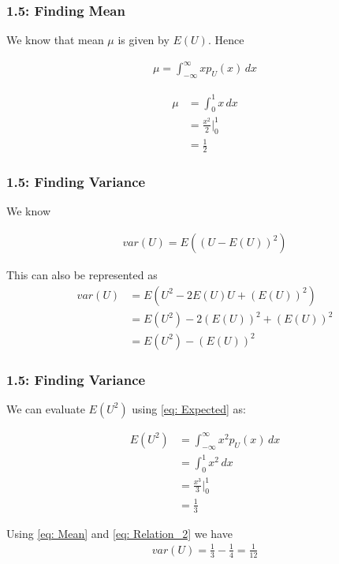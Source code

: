 \documentclass{beamer}
\begin{document}
\begin{frame}
	\frametitle{1.5: Finding Mean}
	We know that mean $\mu$ is given by $E(U)$. Hence

	\begin{align}
		\mu = \int_{-\infty}^{\infty} x p_U(x) \,dx
		\label{eq:Relation_1}
	\end{align}

	\begin{align}
		\mu &= \int_{0}^{1} x \,dx \\
		&= \frac{x^2}{2} \Bigg|^{1}_{0} \\
		&= \frac{1}{2} 
		\label{eq: Mean}
	\end{align}

\end{frame}

\begin{frame}
	\frametitle{1.5: Finding Variance}
	We know

	\begin{align}
		var(U) = E((U - E(U))^2)
	\end{align}

	This can also be represented as
	\begin{align}
		var(U) &= E(U^2 - 2E(U)U + (E(U))^2) \\
		&= E(U^2) - 2(E(U))^2 + (E(U))^2 \\
		&= E(U^2) - (E(U))^2
		\label{eq: Relation_2}
	\end{align}
	
\end{frame}

\begin{frame}
	\frametitle{1.5: Finding Variance}
	We can evaluate $E(U^2)$ using \eqref{eq: Expected} as:
	
	\begin{align}
		E(U^2) &= \int_{-\infty}^{\infty} x^2 p_U(x) \,dx \\
		&= \int_{0}^{1} x^2 \,dx \\
		&= \frac{x^3}{3} \Bigg|^{1}_{0} \\
		&= \frac{1}{3}
	\end{align}

	Using \eqref{eq: Mean} and \eqref{eq: Relation_2} we have
	\begin{align}
		var(U) = \frac{1}{3} - \frac{1}{4} = \frac{1}{12}
	\end{align}

\end{frame}
\end{document}

